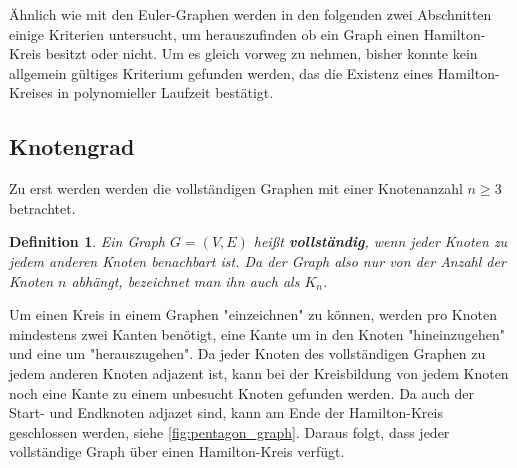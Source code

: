\documentclass{article}
\newtheorem{mydef}{Definition}
\begin{document}
Ähnlich wie mit den Euler-Graphen werden in den folgenden zwei Abschnitten einige Kriterien untersucht, um herauszufinden ob ein Graph einen Hamilton-Kreis besitzt oder nicht. Um es gleich vorweg zu nehmen, bisher konnte kein allgemein gültiges Kriterium gefunden werden, das die Existenz eines Hamilton-Kreises in polynomieller Laufzeit bestätigt.

%
%
\subsection{Knotengrad}

Zu erst werden werden die vollständigen Graphen mit einer Knotenanzahl $n \geq 3$ betrachtet.\footnotemark


\begin{mydef}
	Ein Graph $G=(V,E)$ heißt \textbf{vollständig}, wenn jeder Knoten zu jedem anderen Knoten benachbart ist. Da der Graph also nur von der Anzahl der Knoten $n$ abhängt, bezeichnet man ihn auch als $K_n$. \cite{busing2010graphen}
\end{mydef}

Um einen Kreis in einem Graphen "einzeichnen" zu können, werden pro Knoten mindestens zwei Kanten benötigt, eine Kante um in den Knoten "hineinzugehen" und eine um "herauszugehen". Da jeder Knoten des vollständigen Graphen zu jedem anderen Knoten adjazent ist, kann bei der Kreisbildung von jedem Knoten noch eine Kante zu einem unbesucht Knoten gefunden werden. Da auch der Start- und Endknoten adjazet sind, kann am Ende der Hamilton-Kreis geschlossen werden, siehe \autoref{fig:pentagon_graph}.
Daraus folgt, dass jeder vollständige Graph über einen Hamilton-Kreis verfügt.
\end{document}
